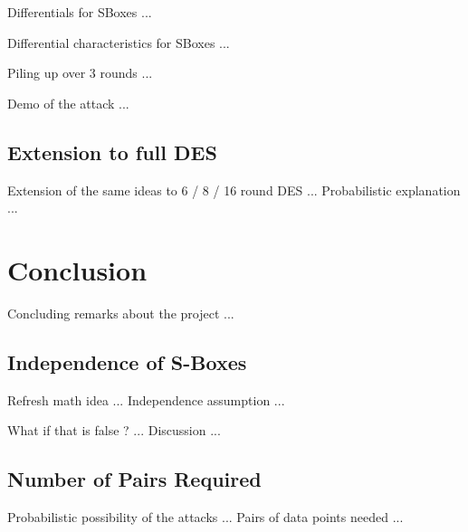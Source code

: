 \documentclass[9pt]{beamer}
\begin{document}
\begin{frame}
Differentials for SBoxes ...

\end{frame}

\begin{frame}
Differential characteristics for SBoxes ...

\end{frame}

\begin{frame}
Piling up over 3 rounds ...

\end{frame}

\begin{frame}
Demo of the attack ...

\end{frame}

\subsection{Extension to full DES}
\begin{frame}
Extension of the same ideas to 6 / 8 / 16 round DES ... Probabilistic explanation ...

\end{frame}


\section{Conclusion}
\begin{frame}
Concluding remarks about the project ...

\end{frame}

\subsection{Independence of S-Boxes}
\begin{frame}
Refresh math idea ... Independence assumption ... 

\end{frame}

\begin{frame}
What if that is false ? ... Discussion ...

\end{frame}

\subsection{Number of Pairs Required}
\begin{frame}
Probabilistic possibility of the attacks ... Pairs of data points needed ... 

\end{frame}
\end{document}
